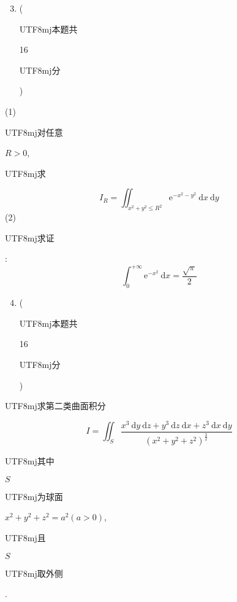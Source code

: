 \documentclass[10pt]{article}
\begin{document}
\begin{enumerate}
  \setcounter{enumi}{2}
  \item (\begin{CJK}{UTF8}{mj}本题共\end{CJK} 16 \begin{CJK}{UTF8}{mj}分\end{CJK})
\end{enumerate}
(1) \begin{CJK}{UTF8}{mj}对任意\end{CJK} $R>0$, \begin{CJK}{UTF8}{mj}求\end{CJK}
$$
I_{R}=\iint_{x^{2}+y^{2} \leqslant R^{2}} \mathrm{e}^{-x^{2}-y^{2}} \mathrm{~d} x \mathrm{~d} y
$$
(2) \begin{CJK}{UTF8}{mj}求证\end{CJK}:
$$
\int_{0}^{+\infty} \mathrm{e}^{-x^{2}} \mathrm{~d} x=\frac{\sqrt{\pi}}{2}
$$

\begin{enumerate}
  \setcounter{enumi}{3}
  \item (\begin{CJK}{UTF8}{mj}本题共\end{CJK} 16 \begin{CJK}{UTF8}{mj}分\end{CJK})
\end{enumerate}
\begin{CJK}{UTF8}{mj}求第二类曲面积分\end{CJK}
$$
I=\iint_{S} \frac{x^{3} \mathrm{~d} y \mathrm{~d} z+y^{3} \mathrm{~d} z \mathrm{~d} x+z^{3} \mathrm{~d} x \mathrm{~d} y}{\left(x^{2}+y^{2}+z^{2}\right)^{\frac{3}{2}}}
$$
\begin{CJK}{UTF8}{mj}其中\end{CJK} $S$ \begin{CJK}{UTF8}{mj}为球面\end{CJK} $x^{2}+y^{2}+z^{2}=a^{2}(a>0)$, \begin{CJK}{UTF8}{mj}且\end{CJK} $S$ \begin{CJK}{UTF8}{mj}取外侧\end{CJK}.
\end{document}
